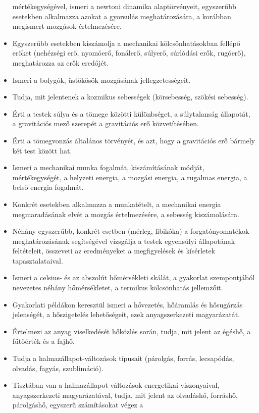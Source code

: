 \begin{itemize}
  mértékegységével, ismeri a newtoni dinamika alaptörvényeit, egyszerűbb
  esetekben alkalmazza azokat a gyorsulás meghatározására, a korábban
  megismert mozgások értelmezésére.
\item
  Egyszerűbb esetekben kiszámolja a mechanikai kölcsönhatásokban fellépő
  erőket (nehézségi erő, nyomóerő, fonálerő, súlyerő, súrlódási erők,
  rugóerő), meghatározza az erők eredőjét.
\item
  Ismeri a bolygók, üstökösök mozgásának jellegzetességeit.
\item
  Tudja, mit jelentenek a kozmikus sebességek (körsebesség, szökési
  sebesség).
\item
  Érti a testek súlya és a tömege közötti különbséget, a súlytalanság
  állapotát, a gravitációs mező szerepét a gravitációs erő
  közvetítésében.
\item
  Érti a tömegvonzás általános törvényét, és azt, hogy a gravitációs erő
  bármely két test között hat.
\item
  Ismeri a mechanikai munka fogalmát, kiszámításának módját,
  mértékegységét, a helyzeti energia, a mozgási energia, a rugalmas
  energia, a belső energia fogalmát.
\item
  Konkrét esetekben alkalmazza a munkatételt, a mechanikai energia
  megmaradásának elvét a mozgás értelmezésére, a sebesség kiszámolására.
\item
  Néhány egyszerűbb, konkrét esetben (mérleg, libikóka) a
  forgatónyomatékok meghatározásának segítségével vizsgálja a testek
  egyensúlyi állapotának feltételeit, összeveti az eredményeket a
  megfigyelések és kísérletek tapasztalataival.
\item
  Ismeri a celsius- és az abszolút hőmérsékleti skálát, a gyakorlat
  szempontjából nevezetes néhány hőmérsékletet, a termikus kölcsönhatás
  jellemzőit.
\item
  Gyakorlati példákon keresztül ismeri a hővezetés, hőáramlás és
  hősugárzás jelenségét, a hőszigetelés lehetőségeit, ezek
  anyagszerkezeti magyarázatát.
\item
  Értelmezi az anyag viselkedését hőközlés során, tudja, mit jelent az
  égéshő, a fűtőérték és a fajhő.
\item
  Tudja a halmazállapot-változások típusait (párolgás, forrás,
  lecsapódás, olvadás, fagyás, szublimáció).
\item
  Tisztában van a halmazállapot-változások energetikai viszonyaival,
  anyagszerkezeti magyarázatával, tudja, mit jelent az olvadáshő,
  forráshő, párolgáshő, egyszerű számításokat végez a

\end{itemize}
